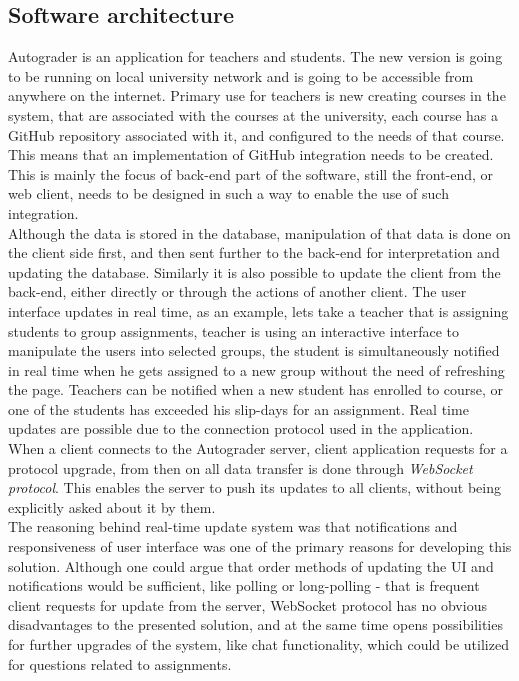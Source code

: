 \subsection{Software architecture}
Autograder is an application for teachers and students. The new version is going to be running on local university network and is going to be accessible from anywhere on the internet. Primary use for teachers is new creating courses in the system, that are associated with the courses at the university, each course has a GitHub repository associated with it, and configured to the needs of that course. This means that an implementation of GitHub integration needs to be created. This is mainly the focus of back-end part of the software, still the front-end, or web client, needs to be designed in such a way to enable the
use of such integration.
\\Although the data is stored in the database, manipulation of that data is done on the client side first, and then sent further to the back-end for interpretation and updating the database. Similarly it is also possible to update the client from the back-end, either directly or through the actions of another client. The user interface updates in real time, as an example, lets take a teacher that is assigning students to group assignments, teacher is using an interactive interface to manipulate the users into selected groups, the student is simultaneously notified in real time when he gets assigned to a new group without the need of refreshing the page. Teachers can be notified when a new student has enrolled to course, or one of the students has exceeded his slip-days for an assignment. Real time updates are possible due to the connection protocol used in the application. When a client connects to the Autograder server, client application requests for a protocol upgrade, from then on all data transfer is done through \emph{WebSocket protocol}\cite{websocket}. This enables the server to push its updates to all clients, without being explicitly asked about it by them.
\\The reasoning behind real-time update system was that notifications and responsiveness of user interface was one of the primary reasons for developing this solution. Although one could argue that order methods of updating the UI and notifications would be sufficient, like polling or long-polling - that is frequent client requests for update from the server, WebSocket protocol has no obvious disadvantages to the presented solution, and at the same time opens possibilities for further upgrades of the system, like chat functionality, which could be utilized for questions related to assignments.

